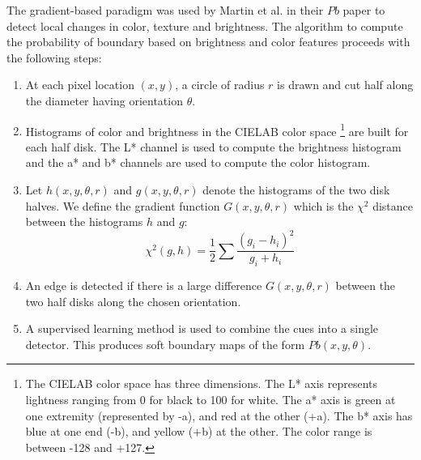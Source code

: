 \documentclass{SMBV13}
\begin{document}
The gradient-based paradigm was used by Martin et al. in their $Pb$ paper \cite{martin2004learning} to detect local changes in color, texture and brightness. The algorithm to compute the probability of boundary based on brightness and color features proceeds with the following steps:
\begin{enumerate}
\item At each pixel location $(x, y)$, a circle of radius $r$ is drawn and cut half along the diameter having orientation $\theta$.
\item Histograms of color and brightness in the CIELAB color space \footnote{The CIELAB color space has three dimensions. The L* axis represents lightness ranging from 0 for black to 100 for white. The a* axis is green at one extremity (represented by -a), and red at the other (+a). The b* axis has blue at one end (-b), and yellow (+b) at the other. The color range is between -128 and +127.} are built for each half disk. The L* channel is used to compute the brightness histogram and the a* and b* channels are used to compute the color histogram. 
\item Let $h(x, y, \theta, r)$ and $g(x, y, \theta, r)$ denote the histograms of the two disk halves. We define the gradient function $G(x, y, \theta, r)$ which is the $\chi^2$ distance between the histograms $h$ and $g$:
\begin{equation}
	\chi^2(g, h) = \frac{1}{2} \sum \dfrac{(g_i - h_i)^2}{g_i + h_i}
\end{equation}
\item An edge is detected if there is a large difference $G(x, y, \theta, r)$ between the two half disks along the chosen orientation.
\item A supervised learning method is used to combine the cues into a single detector. This produces soft boundary maps of the form $Pb(x, y, \theta)$.
\end{enumerate}   
\end{document}
